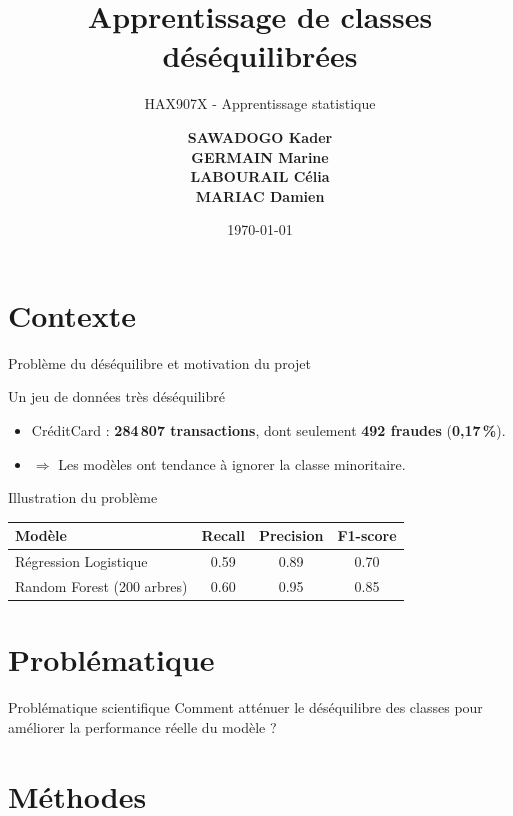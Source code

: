 \documentclass{beamer}
\title[Apprentissage de classes déséquilibrées]{\textbf{Apprentissage de classes déséquilibrées}}
\subtitle{\LARGE HAX907X - Apprentissage statistique}
\author[]{\textbf{SAWADOGO Kader \\ GERMAIN Marine \\ LABOURAIL Célia \\ MARIAC Damien}}
\institute[Université Montpellier]{Université Montpellier \\ Département de Mathématique}
\date{\today}
\begin{document}
\begin{frame}
  \titlepage
\end{frame}
\section{Contexte}

\begin{frame}{Problème du déséquilibre et motivation du projet}
\small

\begin{block}{Un jeu de données très déséquilibré}
\begin{itemize}
    \item   CréditCard  : \textbf{284\,807 transactions}, dont seulement \textbf{492 fraudes} (\textbf{0,17\,\%}).
    \item $\Rightarrow$ Les modèles ont tendance à ignorer la classe minoritaire.
\end{itemize}
\end{block}

\vspace{0.3cm}

\begin{block}{Illustration du problème}
\centering
\begin{tabular}{lccc}
\toprule
\textbf{Modèle} & \textbf{Recall} & \textbf{Precision} & \textbf{F1-score} \\
\midrule
Régression Logistique & 0.59 & 0.89 & 0.70 \\
Random Forest (200 arbres) & 0.60 & 0.95 & 0.85 \\
\bottomrule
\end{tabular}
\end{block}

\end{frame}

\section{Problématique}

\begin{frame}{Problématique scientifique}
    \centering
    \Large{Comment atténuer le déséquilibre des classes pour améliorer la performance réelle du modèle ?}
\end{frame}


\section{Méthodes}
\end{document}

